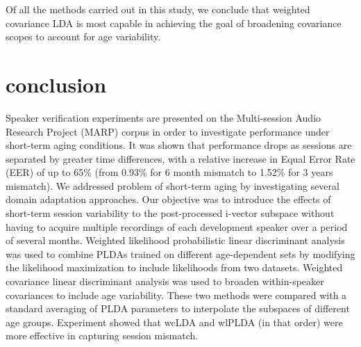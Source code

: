 \documentclass[a4paper]{article}
\begin{document}
Of all the methods carried out in this study, we conclude that weighted covariance LDA is most capable in achieving the goal of broadening covariance scopes to account for age variability.  

\section{conclusion}
Speaker verification experiments are presented on the Multi-session Audio Research Project (MARP) corpus in order to investigate performance under short-term aging conditions. It was shown that performance drops as sessions are separated by greater time differences, with a relative increase in Equal Error Rate (EER) of up to 65\% (from 0.93\% for 6 month mismatch to 1.52\% for 3 years mismatch). We addressed problem of short-term aging by investigating several domain adaptation approaches. Our objective was to introduce the effects of short-term session variability to the post-processed i-vector subspace without having to acquire multiple recordings of each development speaker over a period of several months. Weighted likelihood probabilistic linear discriminant analysis was used to combine PLDAs trained on different age-dependent sets by modifying the likelihood maximization to include likelihoods from two datasets. Weighted covariance linear discriminant analysis was used to broaden within-speaker covariances to include age variability. These two methods were compared with a standard averaging of PLDA parameters to interpolate the subspaces of different age groups. Experiment showed that wcLDA and wlPLDA (in that order) were more effective in capturing session mismatch.  

  \newpage
  

  
\end{document}
